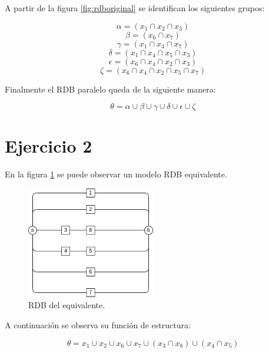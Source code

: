 \documentclass[
    11pt,
    spanish,
    a4paper
]{article}
\begin{document}
A partir de la figura \ref{fig:rdboriginal} se identifican los siguientes grupos:

$$ \alpha = (x_1 \cap x_2 \cap x_3) $$
$$ \beta = (x_6 \cap x_7) $$
$$ \gamma = (x_1 \cap x_4 \cap x_7)$$
$$ \delta = (x_1 \cap x_4 \cap x_5 \cap x_3)$$
$$ \epsilon = (x_6 \cap x_4 \cap x_2 \cap x_3) $$
$$ \zeta = (x_6 \cap x_4 \cap x_2 \cap x_5 \cap x_7)$$

Finalmente el RDB paralelo queda de la siguiente manera:

$$ \theta = \alpha \cup \beta \cup \gamma \cup \delta \cup \epsilon \cup \zeta $$

\newpage

\section{Ejercicio 2}

En la figura \ref{fig:rdbequivalente} se puede observar un modelo RDB equivalente.

\begin{figure}[htbp]
	\centering
	\includegraphics[width=0.5\textwidth]{img/rdb2.png}
	\caption{RDB del equivalente.}
	\label{fig:rdbequivalente}
\end{figure}

A continuación se observa su función de estructura:

$$ \theta = x_1 \cup x_2 \cup x_6 \cup x_7 \cup (x_3 \cap x_8) \cup (x_4 \cap x_5) $$
\end{document}
